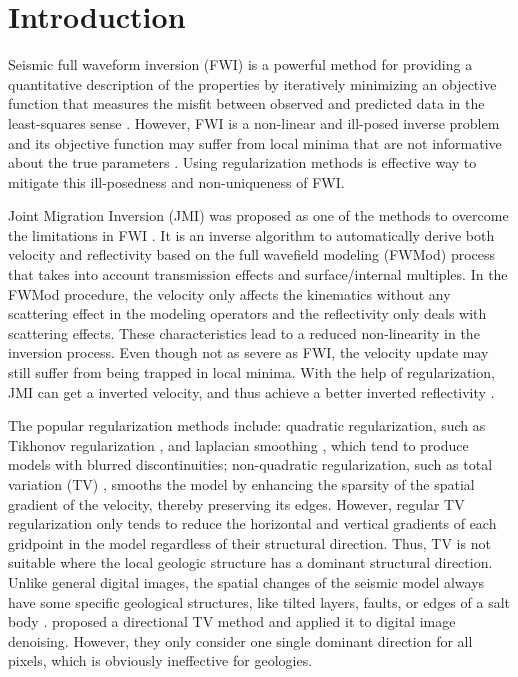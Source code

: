 \section{Introduction}
Seismic full waveform inversion (FWI) is a powerful method for providing a quantitative description of
the  properties by iteratively minimizing an objective function that measures the misfit between observed and predicted data in the least-squares sense \citep{tarantola1984inversion}. However, FWI is a non-linear and ill-posed inverse problem and its objective function may suffer from local minima that are not informative about the true parameters \citep{Virieux09,yangkang2016fwi,fu2017adaptive,fu2017discrepancy}. Using regularization methods is  effective way to mitigate this ill-posedness and non-uniqueness of FWI. 

Joint Migration Inversion (JMI) was proposed as one of the methods to overcome the  limitations in FWI \citep{Berkhout14b,Staalthesis,verschuur2016joint}. It is an inverse algorithm to automatically derive both velocity and reflectivity based on the full wavefield modeling (FWMod) process \citep{Berkhout14a} that takes into account transmission effects and surface/internal multiples. In the FWMod procedure, the velocity only affects the kinematics without any scattering effect in the modeling operators and the reflectivity only deals with scattering effects. These characteristics lead to a reduced non-linearity in the inversion process. Even though not as severe as FWI, the velocity update may still suffer from being trapped in local minima. With the help of regularization, JMI can get a  inverted velocity, and thus achieve a better inverted reflectivity \citep{qu161,qu2017i4d}.

The popular regularization methods include: quadratic  regularization, such as Tikhonov regularization \citep{Hu09}, and laplacian smoothing \citep{guitton2012constrained,qu162,qu2017simultaneous}, which tend to produce models with blurred discontinuities; non-quadratic  regularization, such as total variation (TV) \citep{anagaw2011full,qu161}, smooths the model by enhancing the sparsity of the spatial gradient of the velocity, thereby\old{,} preserving its edges. However, regular TV regularization only tends to reduce the horizontal and vertical gradients of each gridpoint in the model regardless of their structural direction. Thus, TV is not suitable where the local geologic structure has a dominant structural direction. Unlike general digital images, the spatial changes of the seismic model always have some specific geological structures, like tilted layers, faults, or edges of a salt body \citep{yangkang2017lsrtm,wujuan2018cg1,baimin2018cg,yangkang2020gji3}. \cite{bayram2012directional} proposed a directional TV method and applied it to digital image denoising. However, they only consider one single dominant direction for all pixels, which is obviously ineffective for  geologies. 

